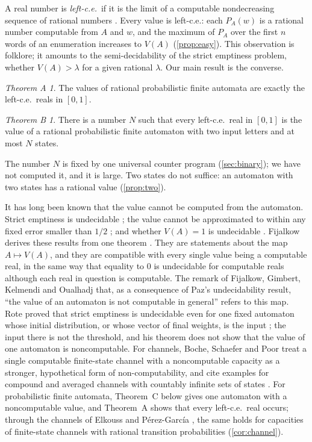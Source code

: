 \documentclass[11pt]{article}
\theoremstyle{plain}
\theoremstyle{definition}
\theoremstyle{remark}
\newtheorem*{mainA}{Theorem A}
\newtheorem*{mainB}{Theorem B}
\begin{document}
A real number is \emph{left-c.e.}\ if it is the limit of a computable nondecreasing sequence of rational numbers \cite{DH10}. Every value is left-c.e.: each $P_A(w)$ is a rational number computable from $A$ and $w$, and the maximum of $P_A$ over the first $n$ words of an enumeration increases to $V(A)$ (\cref{prop:easy}). This observation is folklore; it amounts to the semi-decidability of the strict emptiness problem, whether $V(A)>\lambda$ for a given rational $\lambda$. Our main result is the converse.

\begin{mainA}
The values of rational probabilistic finite automata are exactly the left-c.e.\ reals in $[0,1]$.
\end{mainA}

\begin{mainB}
There is a number $N$ such that every left-c.e.\ real in $[0,1]$ is the value of a rational probabilistic finite automaton with two input letters and at most $N$ states.
\end{mainB}

The number $N$ is fixed by one universal counter program (\cref{sec:binary}); we have not computed it, and it is large. Two states do not suffice: an automaton with two states has a rational value (\cref{prop:two}).

It has long been known that the value cannot be computed from the automaton. Strict emptiness is undecidable \cite{NH69,Paz71}; the value cannot be approximated to within any fixed error smaller than $1/2$ \cite{CL89,MHC03}; and whether $V(A)=1$ is undecidable \cite{GO10}. Fijalkow derives these results from one theorem \cite{Fij17}. They are statements about the map $A\mapsto V(A)$, and they are compatible with every single value being a computable real, in the same way that equality to $0$ is undecidable for computable reals although each real in question is computable. The remark of Fijalkow, Gimbert, Kelmendi and Oualhadj that, as a consequence of Paz's undecidability result, ``the value of an automaton is not computable in general'' \cite{FGKO15} refers to this map. Rote proved that strict emptiness is undecidable even for one fixed automaton whose initial distribution, or whose vector of final weights, is the input \cite{Rot24,Rot25}; the input there is not the threshold, and his theorem does not show that the value of one automaton is noncomputable. For channels, Boche, Schaefer and Poor treat a single computable finite-state channel with a noncomputable capacity as a stronger, hypothetical form of non-computability, and cite examples for compound and averaged channels with countably infinite sets of states \cite[Remark~31]{BSP20}. For probabilistic finite automata, Theorem~C below gives one automaton with a noncomputable value, and Theorem~A shows that every left-c.e.\ real occurs; through the channels of Elkouss and P\'erez-Garc\'ia \cite{EPG18}, the same holds for capacities of finite-state channels with rational transition probabilities (\cref{cor:channel}).
\end{document}
